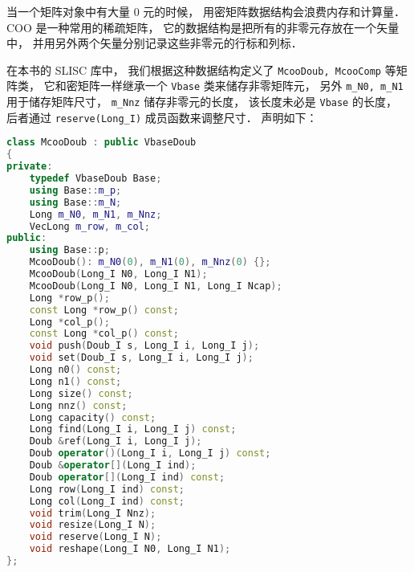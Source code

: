 
\begin{issues}
\issueDraft
\end{issues}


当一个矩阵对象中有大量 0 元的时候， 用密矩阵数据结构会浪费内存和计算量． COO 是一种常用的稀疏矩阵， 它的数据结构是把所有的非零元存放在一个矢量中， 并用另外两个矢量分别记录这些非零元的行标和列标．

在本书的 SLISC 库中， 我们根据这种数据结构定义了 \verb|McooDoub, McooComp| 等矩阵类， 它和密矩阵一样继承一个 \verb|Vbase| 类来储存非零矩阵元， 另外 \verb|m_N0, m_N1| 用于储存矩阵尺寸， \verb|m_Nnz| 储存非零元的长度， 该长度未必是 \verb|Vbase| 的长度， 后者通过 \verb|reserve(Long_I)| 成员函数来调整尺寸． 声明如下：
\begin{lstlisting}[language=cpp]
class McooDoub : public VbaseDoub
{
private:
    typedef VbaseDoub Base;
    using Base::m_p;
    using Base::m_N;
    Long m_N0, m_N1, m_Nnz;
    VecLong m_row, m_col;
public:
    using Base::p;
    McooDoub(): m_N0(0), m_N1(0), m_Nnz(0) {};
    McooDoub(Long_I N0, Long_I N1);
    McooDoub(Long_I N0, Long_I N1, Long_I Ncap);
    Long *row_p();
    const Long *row_p() const;
    Long *col_p();
    const Long *col_p() const;
    void push(Doub_I s, Long_I i, Long_I j);
    void set(Doub_I s, Long_I i, Long_I j);
    Long n0() const;
    Long n1() const;
    Long size() const;
    Long nnz() const;
    Long capacity() const;
    Long find(Long_I i, Long_I j) const;
    Doub &ref(Long_I i, Long_I j);
    Doub operator()(Long_I i, Long_I j) const;
    Doub &operator[](Long_I ind);
    Doub operator[](Long_I ind) const;
    Long row(Long_I ind) const;
    Long col(Long_I ind) const;
    void trim(Long_I Nnz);
    void resize(Long_I N);
    void reserve(Long_I N);
    void reshape(Long_I N0, Long_I N1);
};
\end{lstlisting}
